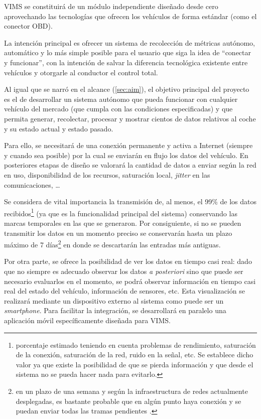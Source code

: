 \ac{VIMS} se constituirá de un módulo independiente diseñado desde cero aprovechando
las tecnologías que ofrecen los vehículos de forma estándar (como el conector
\ac{OBD}).

La intención principal es ofrecer un sistema de recolección de métricas autónomo,
automático y lo más simple posible para el usuario que siga la idea de ``conectar y funcionar'',
con la intención de salvar la diferencia tecnológica existente entre vehículos
y otorgarle al conductor el control total.

Al igual que se narró en el alcance (\ref{sec:aim}), el objetivo principal del proyecto es
el de desarrollar un sistema autónomo que pueda funcionar con cualquier vehículo
del mercado (que cumpla con las condiciones especificadas) y que permita generar,
recolectar, procesar y mostrar cientos de datos relativos al coche y su estado
actual y estado pasado.

Para ello, se necesitará de una conexión permanente y activa a Internet (siempre
y cuando sea posible) por la cual se enviarán en flujo los datos del vehículo.
En posteriores etapas de diseño se valorará la cantidad de datos a enviar según
la red en uso, disponibilidad de los recursos, saturación local, \textit{jitter}
en las comunicaciones, \dots

Se considera de vital importancia la transmisión de, al menos, el 99\% de los
datos recibidos\footnote{porcentaje estimado teniendo en cuenta problemas de
rendimiento, saturación de la conexión, saturación de la red, ruido en la señal, etc. Se establece
dicho valor ya que existe la posibilidad de que se pierda información y que desde el
sistema no se pueda hacer nada para evitarlo.} (ya que es la funcionalidad principal 
del sistema) conservando las
marcas temporales en las que se generaron. Por consiguiente, si no se pueden
transmitir los datos en un momento preciso se conservarán hasta un plazo máximo de
7 días\footnote{en un plazo de una semana y según la infraestructura de redes
actualmente desplegadas, es bastante probable que en algún punto haya conexión
y se puedan enviar todas las tramas pendientes \cite{MobileIoTDeployment,loraallianceCoverageOperatorMaps}.} en donde se descartarán las
entradas más antiguas.

Por otra parte, se ofrece la posibilidad de ver los datos en tiempo casi real: dado que
no siempre es adecuado observar los datos \textit{a posteriori} sino que puede ser necesario evaluarlos en el momento, se podrá observar información en
tiempo casi real del estado del vehículo, información de sensores, etc. Esta
visualización se realizará mediante un dispositivo externo al sistema como
puede ser un \textit{smartphone}. Para facilitar la integración, se desarrollará
en paralelo una aplicación móvil específicamente diseñada para \ac{VIMS}.

